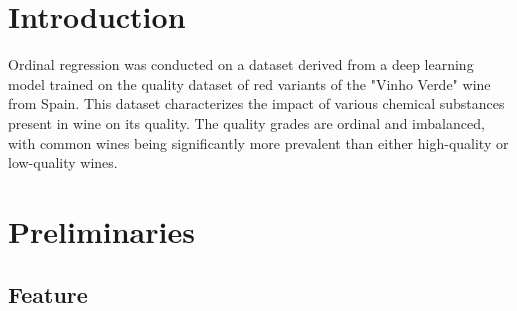 \section{Introduction}
Ordinal regression was conducted on a dataset derived from a deep learning model trained on the quality dataset of red variants of the "Vinho Verde" wine from Spain. This dataset characterizes the impact of various chemical substances present in wine on its quality. The quality grades are ordinal and imbalanced, with common wines being significantly more prevalent than either high-quality or low-quality wines.

\section{Preliminaries} 
\subsection{Feature}\phantom{...}

